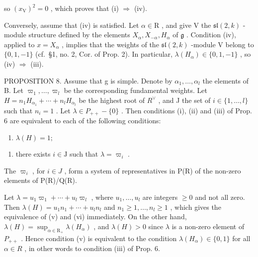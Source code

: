 so \((x_{\mathrm{V}})^2 = 0\) , which proves that (i) \(\Longrightarrow\) (iv).

Conversely, assume that (iv) is satisfied. Let \(\alpha \in \mathrm{R}\) , and give V the \(\mathfrak{sl}(2,k)\) -module structure defined by the elements \(X_{\alpha}, X_{-\alpha}, H_{\alpha}\) of \(\mathfrak{g}\) . Condition (iv), applied to \(x = X_{\alpha}\) , implies that the weights of the \(\mathfrak{sl}(2,k)\) -module V belong to \(\{0,1,-1\}\) (cf.~§1, no. 2, Cor. of Prop. 2). In particular, \(\lambda(H_{\alpha}) \in \{0,1,-1\}\) , so (iv) \(\Longrightarrow\) (iii).

PROPOSITION 8. Assume that g is simple. Denote by \(\alpha_{1},\ldots,\alpha_{l}\) the elements of B. Let \(\varpi_{1},\ldots,\varpi_{l}\) be the corresponding fundamental weights. Let \(H = n_{1}H_{\alpha_{1}} + \cdots + n_{l}H_{\alpha_{l}}\) be the highest root of \(R^{\vee}\) , and J the set of \(i \in \{1,\ldots,l\}\) such that \(n_{i} = 1\) . Let \(\lambda \in P_{++} - \{0\}\) . Then conditions (i), (ii) and (iii) of Prop. 6 are equivalent to each of the following conditions:

\begin{enumerate}
\def\labelenumi{(\alph{enumi})}
\setcounter{enumi}{21}
\tightlist
\item
  \(\lambda(H)=1;\)
\end{enumerate}

\begin{enumerate}
\def\labelenumi{(\roman{enumi})}
\setcounter{enumi}{5}
\tightlist
\item
  there exists \(i \in \mathrm{J}\) such that \(\lambda = \varpi_i\) .
\end{enumerate}

The \(\varpi_{i}\) , for \(i \in J\) , form a system of representatives in P(R) of the non-zero elements of P(R)/Q(R).

Let \(\lambda = u_{1}\varpi_{1} + \cdots + u_{l}\varpi_{l}\) , where \(u_{1}, \ldots, u_{l}\) are integers \(\geq 0\) and not all zero. Then \(\lambda(H) = u_{1}n_{1} + \cdots + u_{l}n_{l}\) and \(n_{1} \geq 1, \ldots, n_{l} \geq 1\) , which gives the equivalence of (v) and (vi) immediately. On the other hand, \(\lambda(H) = \sup_{\alpha \in \mathrm{R}_{+}} \lambda(H_{\alpha})\) , and \(\lambda(H) > 0\) since \(\lambda\) is a non-zero element of \(P_{++}\) . Hence condition (v) is equivalent to the condition \(\lambda(H_{\alpha}) \in \{0, 1\}\) for all \(\alpha \in R\) , in other words to condition (iii) of Prop. 6.

